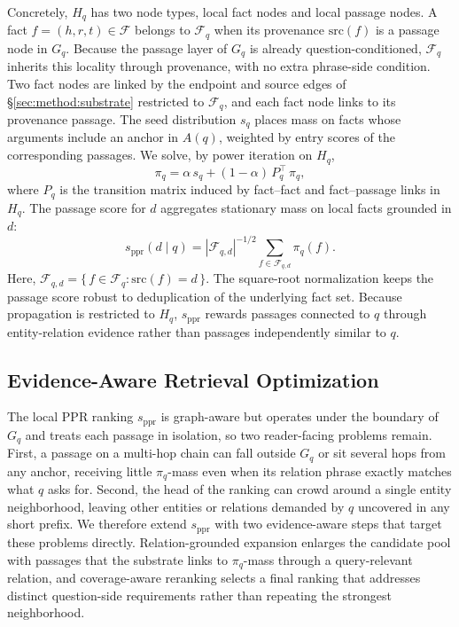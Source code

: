 Concretely, $H_q$ has two node types, local fact nodes and local
passage nodes. A fact $f=(h,r,t) \in \mathcal{F}$ belongs to
$\mathcal{F}_q$ when its provenance $\mathrm{src}(f)$ is a passage
node in $G_q$. Because the passage layer of $G_q$ is already
question-conditioned, $\mathcal{F}_q$ inherits this locality through
provenance, with no extra phrase-side condition. Two fact nodes are
linked by the endpoint and source edges of
\S\ref{sec:method:substrate} restricted to $\mathcal{F}_q$, and each
fact node links to its provenance passage. The seed distribution
$s_q$ places mass on facts whose arguments include an anchor in
$A(q)$, weighted by entry scores of the corresponding passages. We
solve, by power iteration on $H_q$,
\begin{equation}
\label{eq:local-ppr}
\pi_q = \alpha\, s_q + (1-\alpha)\, P_q^{\!\top}\, \pi_q,
\end{equation}
where $P_q$ is the transition matrix induced by fact--fact and
fact--passage links in $H_q$. The passage score for $d$ aggregates
stationary mass on local facts grounded in $d$:
\begin{equation}
\label{eq:passage-score}
s_{\mathrm{ppr}}(d \mid q)
=
|\mathcal{F}_{q,d}|^{-1/2}
\sum_{f \in \mathcal{F}_{q,d}} \pi_q(f).
\end{equation}
Here,
$\mathcal{F}_{q,d}=\{\,f\in\mathcal{F}_q:\mathrm{src}(f)=d\,\}$.
The square-root normalization keeps the passage score robust to
deduplication of the underlying fact set. Because propagation is
restricted to $H_q$, $s_{\mathrm{ppr}}$ rewards passages connected to
$q$ through entity-relation evidence rather than passages independently
similar to $q$.

\subsection{Evidence-Aware Retrieval Optimization}
\label{sec:method:enhancement}

The local PPR ranking $s_{\mathrm{ppr}}$ is graph-aware but operates
under the boundary of $G_q$ and treats each passage in isolation, so
two reader-facing problems remain. First, a passage on a multi-hop
chain can fall outside $G_q$ or sit several hops from any anchor,
receiving little $\pi_q$-mass even when its relation phrase exactly
matches what $q$ asks for. Second, the head of the ranking can crowd
around a single entity neighborhood, leaving other entities or
relations demanded by $q$ uncovered in any short prefix. We therefore
extend $s_{\mathrm{ppr}}$ with two evidence-aware steps that target
these problems directly. Relation-grounded expansion enlarges the
candidate pool with passages that the substrate links to $\pi_q$-mass
through a query-relevant relation, and coverage-aware reranking
selects a final ranking that addresses distinct question-side
requirements rather than repeating the strongest neighborhood.

